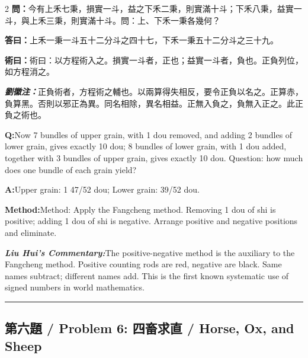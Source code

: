 \documentclass[11pt,a4paper]{article}
\newcommand{\cnwen}{\textcolor{cnlabelfg}{\textbf{問：}}}
\newcommand{\cnda}{\textbf{答曰：}}
\newcommand{\cnshu}{\textcolor{cnlabelfg}{\textbf{術曰：}}}
\newcommand{\cnzhu}{\textcolor{commentarycolor}{\textit{\textbf{劉徽注：}}}}
\newcommand{\enwen}{\textcolor{enlabelfg}{\textbf{Q:}}}
\newcommand{\enda}{\textcolor{enlabelfg}{\textbf{A:}}}
\newcommand{\enshu}{\textcolor{enlabelfg}{\textbf{Method:}}}
\newcommand{\enzhu}{\textcolor{enlabelfg}{\textit{\textbf{Liu Hui's Commentary:}}}}
\begin{document}
\begin{paracol}{2}
\switchcolumn[0]
\cnwen 今有上禾七秉，損實一斗，益之下禾二秉，則實滿十斗；下禾八秉，益實一斗，與上禾三秉，則實滿十斗。問：上、下禾一秉各幾何？

\cnda 上禾一秉一斗五十二分斗之四十七，下禾一秉五十二分斗之三十九。

\cnshu 術曰：以方程術入之。損實一斗者，正也；益實一斗者，負也。正負列位，如方程消之。

\cnzhu 正負術者，方程術之輔也。以兩算得失相反，要令正負以名之。正算赤，負算黑。否則以邪正為異。同名相除，異名相益。正無入負之，負無入正之。此正負之術也。

\switchcolumn[1]
\enwen Now 7 bundles of upper grain, with 1 dou removed, and adding 2 bundles of lower grain, gives exactly 10 dou; 8 bundles of lower grain, with 1 dou added, together with 3 bundles of upper grain, gives exactly 10 dou. Question: how much does one bundle of each grain yield?

\enda Upper grain: 1 47/52 dou; Lower grain: 39/52 dou.

\enshu Method: Apply the Fangcheng method. Removing 1 dou of shi is positive; adding 1 dou of shi is negative. Arrange positive and negative positions and eliminate.

\enzhu The positive-negative method is the auxiliary to the Fangcheng method. Positive counting rods are red, negative are black. Same names subtract; different names add. This is the first known systematic use of signed numbers in world mathematics.
\end{paracol}

\bigskip\hrule\bigskip

\subsection{第六題 / Problem 6: 四畜求直 / Horse, Ox, and Sheep}
\end{document}
